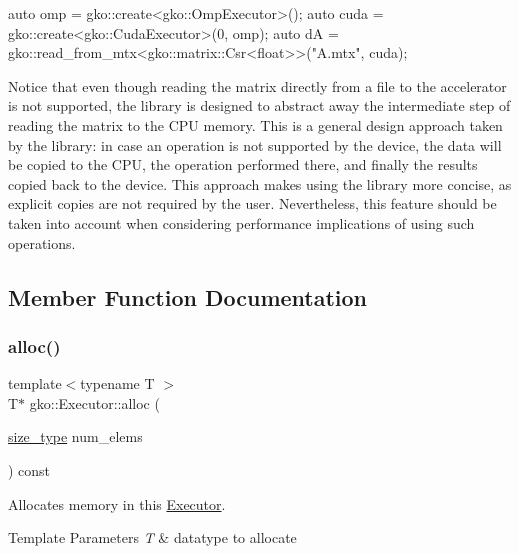 \begin{DoxyCode}
\textcolor{keyword}{auto} omp = gko::create<gko::OmpExecutor>();
\textcolor{keyword}{auto} cuda = gko::create<gko::CudaExecutor>(0, omp);
\textcolor{keyword}{auto} dA = gko::read\_from\_mtx<gko::matrix::Csr<float>>(\textcolor{stringliteral}{"A.mtx"}, cuda);
\end{DoxyCode}
 Notice that even though reading the matrix directly from a file to the accelerator is not supported, the library is designed to abstract away the intermediate step of reading the matrix to the C\+PU memory. This is a general design approach taken by the library\+: in case an operation is not supported by the device, the data will be copied to the C\+PU, the operation performed there, and finally the results copied back to the device. This approach makes using the library more concise, as explicit copies are not required by the user. Nevertheless, this feature should be taken into account when considering performance implications of using such operations. 

\subsection{Member Function Documentation}
\mbox{\label{classgko_1_1Executor_a5a216c2b1f7ceb8a0190c08941c1c687}} 
\subsubsection{\texorpdfstring{alloc()}{alloc()}}
{\footnotesize\ttfamily template$<$typename T $>$ \\
T$\ast$ gko\+::\+Executor\+::alloc (\begin{DoxyParamCaption}\item[{\hyperlink{namespacegko_a6e5c95df0ae4e47aab2f604a22d98ee7}{size\+\_\+type}}]{num\+\_\+elems }\end{DoxyParamCaption}) const}



Allocates memory in this \hyperlink{classgko_1_1Executor}{Executor}. 


\begin{DoxyTemplParams}{Template Parameters}
{\em T} & datatype to allocate\\
\hline
\end{DoxyTemplParams}

